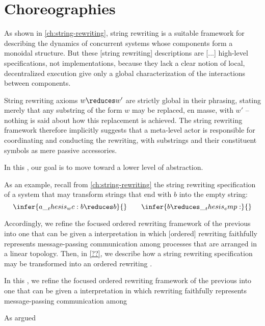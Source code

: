 \chapter{Choreographies}\label{ch:choreographies}

As shown in \cref{ch:string-rewriting}, string rewriting is a suitable framework for describing the dynamics of concurrent systems whose components form a monoidal structure.
But these [string rewriting] descriptions are [...] high-level specifications, not implementations, because they lack a clear notion of local, decentralized execution give only a global characterization of the interactions between components.

String rewriting axioms $w \reduces w'$ are strictly global in their phrasing, stating merely that any substring of the form $w$ may be replaced, en masse, with $w'$ -- nothing is said about how this replacement is achieved.
The string rewriting framework therefore implicitly suggests that a meta-level actor is responsible for coordinating and conducting the rewriting, with substrings and their constituent symbols as mere passive accessories.

In this , our goal is to move toward a lower level of abstraction.


As an example, recall from \cref{ch:string-rewriting} the string rewriting specification of a system that may transform strings that end with $b$ into the empty string:
\begin{equation}
  \infer{a \wc b \reduces b}{}
  \qquad
  \infer{b \reduces \emp}{}
\end{equation}


Accordingly, we refine the focused ordered rewriting framework of the previous  into one that can be given a  interpretation in which [ordered] rewriting faithfully represents message-passing communication among processes that are arranged in a linear topology.
Then, in \cref{??}, we describe how a string rewriting specification may be transformed into an ordered rewriting .

In this , we refine the focused ordered rewriting framework of the previous  into one that can be given a  interpretation in which rewriting faithfully represents message-passing communication among 

As argued 

